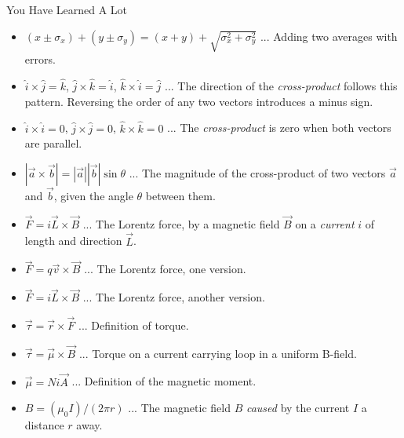 \documentclass{beamer}
\begin{document}
\begin{frame}{You Have Learned A Lot}
\scriptsize
\begin{itemize}
\item $(x \pm \sigma_x) + (y \pm \sigma_y) = (x+y) + \sqrt{\sigma_x^2 + \sigma_y^2}$ ... Adding two averages with errors.
\item $\hat{i} \times \hat{j} = \hat{k}$, $\hat{j} \times \hat{k} = \hat{i}$, $\hat{k} \times \hat{i} = \hat{j}$ ... The direction of the \textit{cross-product} follows this pattern.  Reversing the order of any two vectors introduces a minus sign.
\item $\hat{i} \times \hat{i} = 0$, $\hat{j} \times \hat{j} = 0$, $\hat{k} \times \hat{k} = 0$ ... The \textit{cross-product} is zero when both vectors are parallel.
\item $|\vec{a} \times \vec{b}| = |\vec{a}||\vec{b}|\sin\theta$ ... The magnitude of the cross-product of two vectors $\vec{a}$ and $\vec{b}$, given the angle $\theta$ between them.
\item $\vec{F} = i\vec{L} \times \vec{B}$ ... The Lorentz force, by a magnetic field $\vec{B}$ on a \textit{current} $i$ of length and direction $\vec{L}$.
\item $\vec{F} = q\vec{v} \times \vec{B}$ ... The Lorentz force, one version.
\item $\vec{F} = i\vec{L} \times \vec{B}$ ... The Lorentz force, another version.
\item $\vec{\tau} = \vec{r} \times \vec{F}$ ... Definition of torque.
\item $\vec{\tau} = \vec{\mu} \times \vec{B}$ ... Torque on a current carrying loop in a uniform B-field.
\item $\vec{\mu} = Ni\vec{A}$ ... Definition of the magnetic moment.
\item $B = (\mu_0 I)/(2\pi r)$ ... The magnetic field $B$ \textit{caused} by the current $I$ a distance $r$ away.
\end{itemize}
\end{frame}
\end{document}

